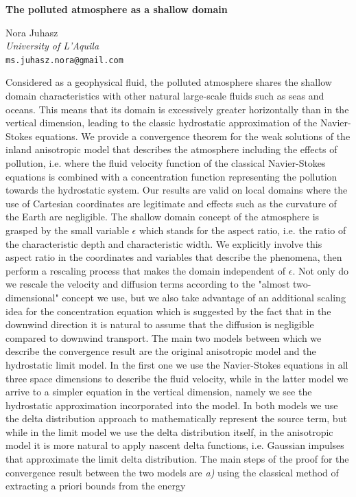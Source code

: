 \documentclass[twoside]{article}
\begin{document}

\begin{center}
\textbf{\large The polluted atmosphere as a shallow domain}
\end{center}

\medskip


\begin{center}
Nora Juhasz\\
\emph{University  of L'Aquila}\\
\texttt{ms.juhasz.nora@gmail.com}
\end{center}

\bigskip

\noindent
Considered as a geophysical fluid, the polluted atmosphere shares the shallow domain characteristics with other natural large-scale fluids such as seas and oceans. This means that its domain is excessively greater horizontally than in the vertical dimension, leading to the classic hydrostatic approximation of the Navier-Stokes equations. We provide a convergence theorem for the weak solutions of the inland anisotropic model that describes the atmosphere including the effects of pollution, i.e. where the fluid velocity function of the classical Navier-Stokes equations is combined with a concentration function representing the pollution towards the hydrostatic system. Our results are valid on local domains where the use of Cartesian coordinates are legitimate and effects such as the curvature of the Earth are negligible. The shallow domain concept of the atmosphere is grasped by the small variable $\epsilon$ which stands for the aspect ratio, i.e. the ratio of the characteristic depth and characteristic width. We explicitly involve this aspect ratio in the coordinates and variables that describe the phenomena, then perform a rescaling process that makes the domain independent of $\epsilon$. Not only do we rescale the velocity and diffusion terms according to the "almost two-dimensional" concept we use, but we also take advantage of an additional scaling idea for the concentration equation which is suggested by the fact that in the downwind direction it is natural to assume that the diffusion is negligible compared to downwind transport. The main two models between which we describe the convergence result are the original anisotropic model and the hydrostatic limit model. In the first one we use the Navier-Stokes equations in all three space dimensions to describe the fluid velocity, while in the latter model we arrive to a simpler equation in the vertical dimension, namely we see the hydrostatic approximation incorporated into the model. In both models we use the delta distribution approach to mathematically represent the source term, but while in the limit model we use the delta distribution itself, in the anisotropic model it is more natural to apply nascent delta functions, i.e. Gaussian impulses that approximate the limit delta distribution. The main steps of the proof for the convergence result between the two models are \textit{a)} using the classical method of extracting a priori bounds from the energy 
\end{document}
